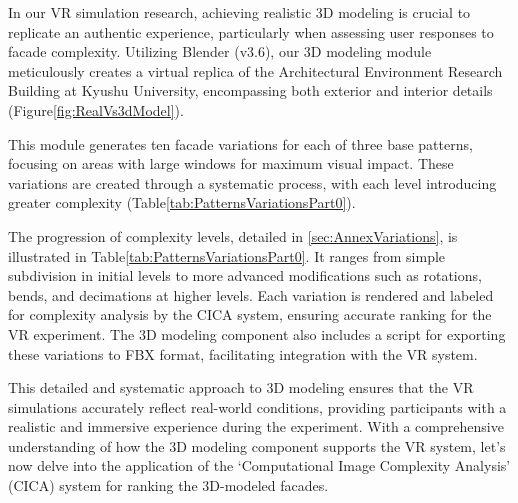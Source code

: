 %    



In our VR simulation research, achieving realistic 3D modeling is crucial to replicate an authentic experience, particularly when assessing user responses to facade complexity.
Utilizing Blender (v3.6), our 3D modeling module meticulously creates a virtual replica of the Architectural Environment Research Building at Kyushu University, encompassing both exterior and interior details (Figure\ref{fig:RealVs3dModel}).



This module generates ten facade variations for each of three base patterns, focusing on areas with large windows for maximum visual impact.
These variations are created through a systematic process, with each level introducing greater complexity (Table\ref{tab:PatternsVariationsPart0}).



The progression of complexity levels, detailed in \ref{sec:AnnexVariations}, is illustrated in Table\ref{tab:PatternsVariationsPart0}.
It ranges from simple subdivision in initial levels to more advanced modifications such as rotations, bends, and decimations at higher levels.
Each variation is rendered and labeled for complexity analysis by the CICA system, ensuring accurate ranking for the VR experiment.
The 3D modeling component also includes a script for exporting these variations to FBX format, facilitating integration with the VR system.

This detailed and systematic approach to 3D modeling ensures that the VR simulations accurately reflect real-world conditions, providing participants with a realistic and immersive experience during the experiment.
With a comprehensive understanding of how the 3D modeling component supports the VR system, let's now delve into the application of the `Computational Image Complexity Analysis' (CICA) system for ranking the 3D-modeled facades.


